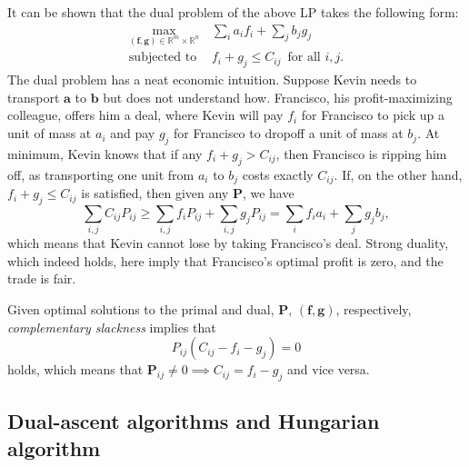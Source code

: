 \documentclass[11pt,reqno]{amsart}
\newcommand{\R}{\mathbb{R}}
\renewcommand{\b}{\mathbf}
\theoremstyle{definition}
\theoremstyle{remark}
\begin{document}
    It can be shown that the dual problem of the above LP takes the following
    form: \begin{align*}
    \max_{(\b f, \b g) \in \R^{m} \times \R^n} \, & \sum_i a_i f_i + \sum_j b_j
    g_j
    \\ 
    \text{subjected to } & f_i + g_j \le C_{ij}\, \text{ for all $i,j$}.
    \end{align*}
    The dual problem has a neat economic intuition. Suppose Kevin needs to
    transport $\b a$ to $\b b$ but does not understand how. Francisco, his
    profit-maximizing colleague, offers him a deal, where Kevin will pay $f_i$
    for Francisco to
    pick up a unit of mass at $a_i$ and pay $g_j$ for Francisco to dropoff a
    unit of mass at $b_j.$ At minimum, Kevin knows that if any $f_i + g_j > C_
    {ij}$, then Francisco is ripping him off, as transporting one unit from
    $a_i$ to $b_j$ costs exactly $C_{ij}$. If, on the other hand, $f_i + g_j
    \le C_{ij}$ is satisfied, then given any $\b P$, we have \[
    \sum_{i,j} C_{ij}P_{ij} \ge \sum_{i,j} f_i P_{ij} + \sum_{i,j} g_j P_{ij} =
    \sum_i f_i a_i + \sum_j g_j b_j \tag{Weak duality},
    \]
    which means that Kevin cannot lose by taking Francisco's deal. Strong
    duality, which indeed holds, here imply that Francisco's optimal profit is
    zero, and the trade is fair.
    
    
    Given optimal solutions to the primal and dual, $\b P$, $(\b f, \b g)$,
    respectively, \emph{complementary slackness} implies that \[
    P_{ij} (C_{ij} - f_i - g_j) = 0 \tag{Complementary slackness}
    \]
    holds, which means that $\b P_{ij} \neq 0 \implies C_{ij} = f_i - g_j$ and
    vice versa. 
        
    \subsection{Dual-ascent algorithms and Hungarian algorithm}
    
\end{document}
